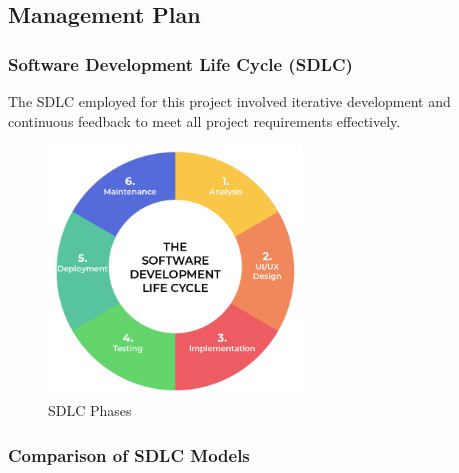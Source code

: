 \subsection{Management Plan}

\subsubsection{Software Development Life Cycle (SDLC)}
The SDLC employed for this project involved iterative development and continuous feedback to meet all project requirements effectively.
\begin{figure}[h]
  \centering
  \includegraphics[width=0.6\textwidth]{Images/sdlc.png}
  \caption{SDLC Phases}
  \label{fig:SDLC Phases}
\end{figure}

\subsubsection{Comparison of SDLC Models}

